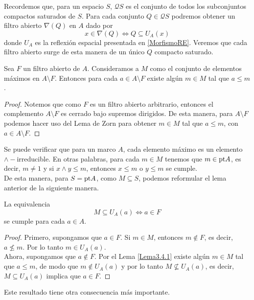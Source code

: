 Recordemos que, para un espacio $S$, $\mathcal{Q}S$ es el conjunto de todos los subconjuntos compactos saturados de $S$. Para cada conjunto $Q\in \mathcal{Q}S$ podremos obtener un filtro abierto $\nabla(Q)$ en $A$ dado por 
\[
x\in \nabla(Q) \Leftrightarrow Q\subseteq U_A(x)
\]
donde $U_A$ es la reflexión espacial presentada en \ref{MorfismoRE}. Veremos que cada filtro abierto surge de esta manera de un único $Q$ compacto saturado.

\begin{lem}\label{Lema3.4.1}
        Sea $F$ un filtro abierto de $A$. Consideramos a $M$ como el conjunto de elementos máximos en $A\setminus F$. Entonces para cada $a\in A\setminus F$ existe algún $m\in M$ tal que $a\leq m$.
\end{lem}

\begin{proof}
    Notemos que como $F$ es un filtro abierto arbitrario, entonces el complemento $A\setminus F$ es cerrado bajo supremos dirigidos. De esta manera, para $A\setminus F$ podemos hacer uso del Lema de Zorn para obtener $m\in M$ tal que $a\leq m$, con $a\in A\setminus F$.
\end{proof}

Se puede verificar que para un marco $A$, cada elemento máximo es un elemento $\wedge-$irreducible. En otras palabras, para cada $m\in M$ tenemos que $m\in \mathrm{pt} A$, es decir, $m\neq 1$ y si $x\wedge y\leq m$, entonces $x\leq m$ o $y\leq m$ se cumple.\\

De esta manera, para $S=\mathrm{pt} A$, como $M\subseteq S$, podemos reformular el lema anterior de la siguiente manera.

\begin{cor}\label{HM1}
    La equivalencia
    \[
    M\subseteq U_A(a)\Leftrightarrow a\in F
    \]
    se cumple para cada $a\in A$.
\end{cor}

\begin{proof}
    Primero, supongamos que $a\in F$. Si $m\in M$, entonces $m\notin F$, es decir, $a\nleq m$. Por lo tanto $m\in U_A(a)$.\\

    Ahora, supongamos que $a\notin F$. Por el Lema \ref{Lema3.4.1} existe algún $m\in M$ tal que $a\leq m$, de modo que $m\notin U_A(a)$ y por lo tanto $M\nsubseteq U_A(a)$, es decir, $M\subseteq U_A(a)$ implica que $a\in F$.
\end{proof}

Este resultado tiene otra consecuencia más importante.


